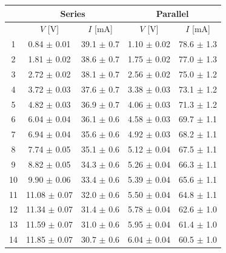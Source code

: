 \documentclass{article}
\begin{document}
{\begin{table}[H]
    \centering
    \begin{tabular}{ccc||cc}
        \toprule
           & \multicolumn{2}{c||}{Series} & \multicolumn{2}{c}{Parallel}                                        \\
        \midrule
           & $V$ [V]                      & $I$ [mA]                     & $V$ [V]           & $I$ [mA]         \\
        \midrule
        1  & 0.84    $\pm$ 0.01           & 39.1    $\pm$ 0.7            & 1.10   $\pm$ 0.02 & 78.6   $\pm$ 1.3 \\
        2  & 1.81    $\pm$ 0.02           & 38.6    $\pm$ 0.7            & 1.75   $\pm$ 0.02 & 77.0   $\pm$ 1.3 \\
        3  & 2.72    $\pm$ 0.02           & 38.1    $\pm$ 0.7            & 2.56   $\pm$ 0.02 & 75.0   $\pm$ 1.2 \\
        4  & 3.72    $\pm$ 0.03           & 37.6    $\pm$ 0.7            & 3.38   $\pm$ 0.03 & 73.1   $\pm$ 1.2 \\
        5  & 4.82    $\pm$ 0.03           & 36.9    $\pm$ 0.7            & 4.06   $\pm$ 0.03 & 71.3   $\pm$ 1.2 \\
        6  & 6.04    $\pm$ 0.04           & 36.1    $\pm$ 0.6            & 4.58   $\pm$ 0.03 & 69.7   $\pm$ 1.1 \\
        7  & 6.94    $\pm$ 0.04           & 35.6    $\pm$ 0.6            & 4.92   $\pm$ 0.03 & 68.2   $\pm$ 1.1 \\
        8  & 7.74    $\pm$ 0.05           & 35.1    $\pm$ 0.6            & 5.12   $\pm$ 0.04 & 67.5   $\pm$ 1.1 \\
        9  & 8.82    $\pm$ 0.05           & 34.3    $\pm$ 0.6            & 5.26   $\pm$ 0.04 & 66.3   $\pm$ 1.1 \\
        10 & 9.90    $\pm$ 0.06           & 33.4    $\pm$ 0.6            & 5.39   $\pm$ 0.04 & 65.6   $\pm$ 1.1 \\
        11 & 11.08   $\pm$ 0.07           & 32.0    $\pm$ 0.6            & 5.50   $\pm$ 0.04 & 64.8   $\pm$ 1.1 \\
        12 & 11.34   $\pm$ 0.07           & 31.4    $\pm$ 0.6            & 5.78   $\pm$ 0.04 & 62.6   $\pm$ 1.0 \\
        13 & 11.59   $\pm$ 0.07           & 31.0    $\pm$ 0.6            & 5.95   $\pm$ 0.04 & 61.4   $\pm$ 1.0 \\
        14 & 11.85   $\pm$ 0.07           & 30.7    $\pm$ 0.6            & 6.04   $\pm$ 0.04 & 60.5   $\pm$ 1.0 \\

\end{tabular}
\end{table}}
\end{document}
